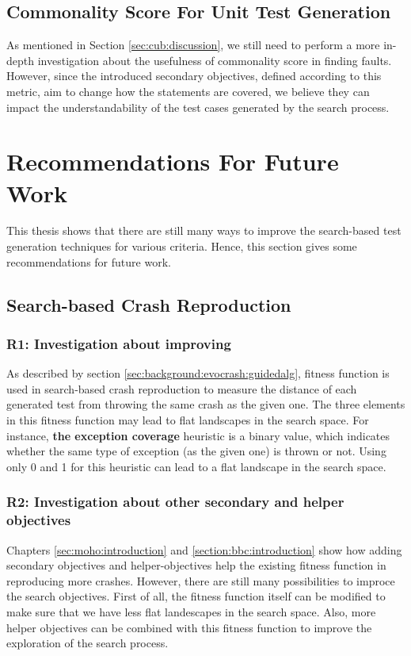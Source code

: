 \subsection{Commonality Score For Unit Test Generation}
As mentioned in Section \ref{sec:cub:discussion}, we still need to perform a more in-depth investigation about the usefulness of commonality score in finding faults. However, since the introduced secondary objectives, defined according to this metric, aim to change how the statements are covered, we believe they can impact the understandability of the test cases generated by the search process.


\section{Recommendations For Future Work}
This thesis shows that there are still many ways to improve the search-based test generation techniques for various criteria. Hence, this section gives some recommendations for future work.
\subsection{Search-based Crash Reproduction}

\subsubsection{R1: Investigation about improving \CrashFunction}
As described by section \ref{sec:background:evocrash:guidedalg}, \CrashFunction fitness function is used in search-based crash reproduction to measure the distance of each generated test from throwing the same crash as the given one. The three elements in this fitness function may lead to flat landscapes in the search space. For instance, \textbf{the exception coverage} heuristic is a binary value, which indicates whether the same type of exception (as the given one) is thrown or not. Using only 0 and 1 for this heuristic can lead to a flat landscape in the search space.


\subsubsection{R2: Investigation about other secondary and helper objectives}
 Chapters \ref{sec:moho:introduction} and \ref{section:bbc:introduction} show how adding secondary objectives and helper-objectives help the existing \CrashFunction fitness function in reproducing more crashes. However, there are still many possibilities to improce the search objectives. First of all, the \CrashFunction fitness function itself can be modified to make sure that we have less flat landescapes in the search space. Also, more helper objectives can be combined with this fitness function to improve the exploration of the search process.



